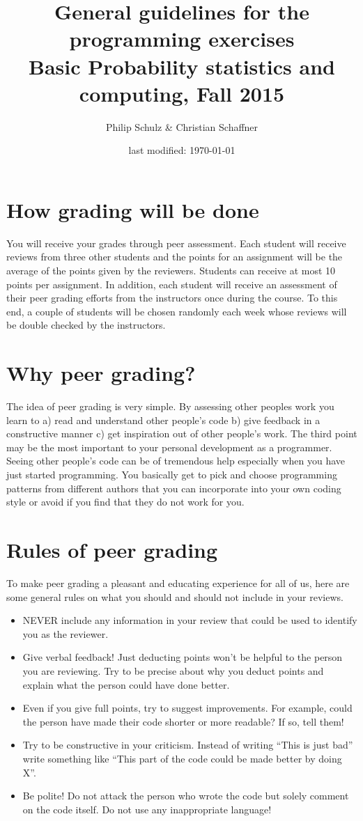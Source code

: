 \documentclass[a4paper, leqno, 11pt]{article}
\title{General guidelines for the programming exercises \\
Basic Probability statistics and computing, Fall 2015}
\author{Philip Schulz \& Christian Schaffner}
\date{last modified: \today}
\begin{document}
\maketitle

\section{How grading will be done}
You will receive your grades through peer assessment. Each student will receive reviews from three other students and the points for an assignment
will be the average of the points given by the reviewers. Students can receive at most 10 points per assignment. In addition,
each student will receive an assessment of their peer grading efforts from the instructors once during the course. To this end, a couple of students will
be chosen randomly each week whose reviews will be double checked by the instructors. 

\section{Why peer grading?}
The idea of peer grading is very simple. By assessing other peoples work you learn to a) read and understand other people's code 
b) give feedback in a constructive manner c) get inspiration out of other people's work. The third point may be the most important
to your personal development as a programmer. Seeing other people's code can be of tremendous help especially when you have just
started programming. You basically get to pick and choose programming patterns from different authors that you can incorporate
into your own coding style or avoid if you find that they do not work for you.

\section{Rules of peer grading}
To make peer grading a pleasant and educating experience for all of us, here are some general rules on what you should and should
not include in your reviews.
\begin{itemize}
\item NEVER include any information in your review that could be used to identify you as the reviewer.
\item Give verbal feedback! Just deducting points won't be helpful to the person you are reviewing. Try to be precise about why
you deduct points and explain what the person could have done better.
\item Even if you give full points, try to suggest improvements. For example, could the person have made their code shorter or more
readable? If so, tell them!
\item Try to be constructive in your criticism. Instead of writing ``This is just bad'' write something like ``This part of the code
could be made better by doing X''.
\item Be polite! Do not attack the person who wrote the code but solely comment on the code itself. Do not use any inappropriate language!
\end{itemize}
\end{document}
